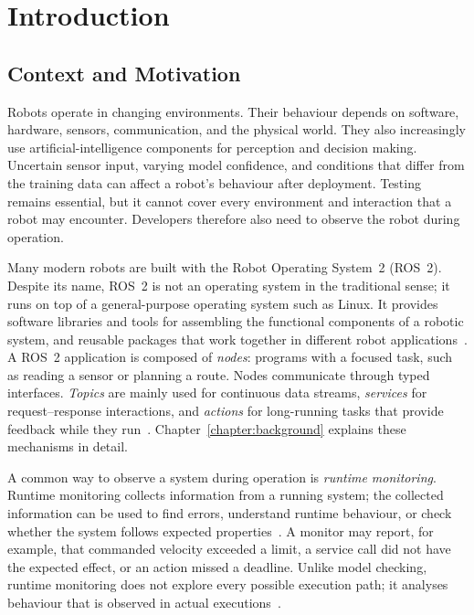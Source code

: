 \chapter{Introduction}\label{chapter:introduction}

\section{Context and Motivation}

Robots operate in changing environments. Their behaviour depends on software,
hardware, sensors, communication, and the physical world. They also increasingly
use artificial-intelligence components for perception and decision making.
Uncertain sensor input, varying model confidence, and conditions that differ
from the training data can affect a robot's behaviour after
deployment. Testing remains essential, but it cannot cover every environment
and interaction that a robot may encounter. Developers therefore also need to
observe the robot during operation.

Many modern robots are built with the Robot Operating System~2 (ROS~2).
Despite its name, ROS~2 is not an operating system in the traditional sense;
it runs on top of a general-purpose operating system such as Linux. It
provides software libraries and tools for assembling the functional components
of a robotic system, and reusable packages that work together in different
robot applications~\cite{macenski2022ros2}. A ROS~2 application is composed of
\emph{nodes}: programs with a focused task, such as reading a sensor or
planning a route. Nodes communicate through typed interfaces. \emph{Topics}
are mainly used for continuous data streams, \emph{services} for
request--response interactions, and \emph{actions} for long-running tasks that
provide feedback while they run~\cite{macenski2022ros2,ros2interfaces}.
Chapter~\ref{chapter:background} explains these mechanisms in detail.

A common way to observe a system during operation is \emph{runtime
monitoring}. Runtime monitoring collects information from a running system;
the collected information can be used to find errors, understand runtime
behaviour, or check whether the system follows expected
properties~\cite{rabiser2019domain,leucker2009brief}. A monitor may report,
for example, that commanded velocity exceeded a limit, a service call did not
have the expected effect, or an action missed a deadline. Unlike model
checking, runtime monitoring does not explore every possible execution path;
it analyses behaviour that is observed in actual
executions~\cite{leucker2009brief}.

